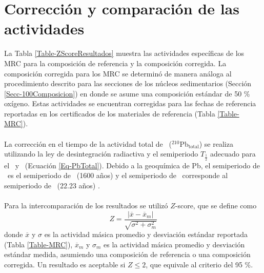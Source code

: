\section{Corrección y comparación de las actividades}
La Tabla \ref{Table-ZScoreResultados} muestra las actividades específicas de los MRC para la composición de referencia y la composición corregida. La composición corregida para los MRC se determinó de manera análoga al procedimiento descrito para las secciones de los núcleos sedimentarios (Sección \ref{Secc-100Composicion}) en donde se asume una composición estándar de 50 \% oxígeno. Estas actividades se encuentran corregidas para las fechas de referencia reportadas en los certificados de los materiales de referencia (Tabla \ref{Table-MRC}). 
\\
\\
La corrección en el tiempo de la actividad total de \PbCero\, ($^{210}$Pb$_\text{total}$) se realiza utilizando la ley de desintegración radiactiva y el semiperiodo $T_{\frac{1}{2}}$ adecuado para el \PbCeroBa\, y \PbCeroEx\, (Ecuación \ref{Eq-PbTotal}). Debido a la geoquímica de Pb, el semiperiodo de \PbCeroBa\, es el semiperiodo de \Ra\, (1600 años) \cite{DataDecayEvaluation} y el semiperiodo de \PbCeroEx\, corresponde al semiperiodo de \PbCero\, (22.23 años) \cite{DataDecayEvaluation}. 
\\
\\
Para la intercomparación de los resultados se utilizó $Z$-score, que se define como 
\begin{equation}\label{Eq-Zscore}
Z = \dfrac{| \overline{x} - \overline{x}_m | }{\sqrt{\sigma^2 + \sigma_m^2}}
\end{equation}
donde $\overline{x}$ y $\sigma$ es la actividad másica promedio y desviación estándar reportada (Tabla \ref{Table-MRC}), $\overline{x}_m$ y $\sigma_m$ es la actividad másica promedio y desviación estándar medida, asumiendo una composición de referencia o una composición corregida. Un resultado es aceptable si $Z \leq 2$, que equivale al criterio del 95 \%. \\
